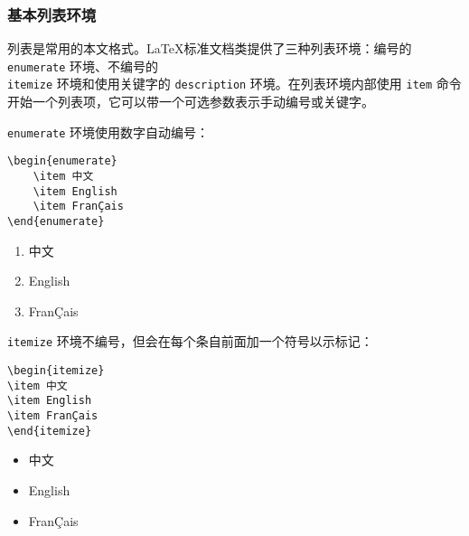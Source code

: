 \subsubsection{基本列表环境}

列表是常用的本文格式。\LaTeX 标准文档类提供了三种列表环境：编号的 \verb|enumerate| 环境、不编号的\\ 
 \verb|itemize| 环境和使用关键字的 \verb|description| 环境。在列表环境内部使用 \verb|item| 命令开始一个列表项，它可以带一个可选参数表示手动编号或关键字。

 \verb|enumerate| 环境使用数字自动编号：

 \begin{minipage}[t]{0.45\textwidth}
\begin{lstlisting}
\begin{enumerate}
    \item 中文
    \item English
    \item FranÇais
\end{enumerate}
\end{lstlisting}

 \end{minipage}
 \hfill
 \begin{minipage}[t]{0.45\textwidth}
\begin{enumerate}
    \item 中文
    \item English
    \item FranÇais
\end{enumerate}
 \end{minipage}


\verb|itemize| 环境不编号，但会在每个条自前面加一个符号以示标记：

\begin{minipage}[t]{0.45\textwidth}
\begin{lstlisting}
\begin{itemize}
\item 中文
\item English
\item FranÇais
\end{itemize}
\end{lstlisting}
\end{minipage}
\hfill
\begin{minipage}[t]{0.45\textwidth}
    \begin{itemize}
        \item 中文
        \item English
        \item FranÇais
    \end{itemize}
\end{minipage}

